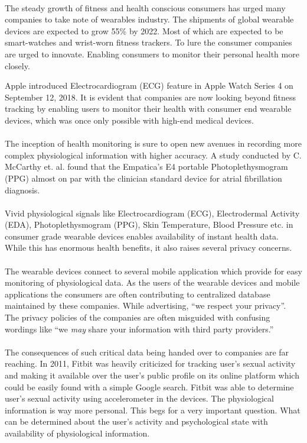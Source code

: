 \paragraph{}
The steady growth of fitness and health conscious consumers has urged many companies to take note of wearables industry. The shipments of global wearable devices are expected to grow 55\% by 2022.\cite{WearableStudy} Most of which are expected to be smart-watches and wrist-worn fitness trackers. To lure the consumer companies are urged to innovate. Enabling consumers to monitor their personal health more closely.

Apple introduced Electrocardiogram (ECG) feature in Apple Watch Series 4 on September 12, 2018. It is evident that companies are now looking beyond fitness tracking by enabling users to monitor their health with consumer end wearable devices, which was once only possible with high-end medical devices.
\paragraph{}
The inception of health monitoring is sure to open new avenues in recording more complex physiological information with higher accuracy. A study conducted by C. McCarthy et. al. found that the Empatica's E4 portable Photoplethysmogram (PPG) almost on par with the clinician standard device for atrial fibrillation diagnosis. \cite{7508621}
\paragraph{}
Vivid physiological signals like Electrocardiogram (ECG), Electrodermal Activity (EDA), Photoplethysmogram (PPG), Skin Temperature, Blood Pressure etc. in consumer grade wearable devices enables availability of instant health data. While this has enormous health benefits, it also raises several privacy concerns.
\paragraph{}
The wearable devices connect to several mobile application which provide for easy monitoring of physiological data. As the users of the wearable devices and mobile applications the consumers are often contributing to centralized database maintained by these companies. While advertising, “we respect your privacy”. The privacy policies of the companies are often misguided with confusing wordings like “we \textit{may} share your information with third party providers.”
\paragraph{}
The consequences of such critical data being handed over to companies are far reaching. In 2011, Fitbit was heavily criticized for tracking user’s sexual activity and making it available over the user’s public profile on its online platform which could be easily found with a simple Google search.\cite{Fitbit} Fitbit was able to determine user’s sexual activity using accelerometer in the devices. The physiological information is way more personal.
This begs for a very important question. What can be determined about the user’s activity and psychological state with availability of physiological information.
